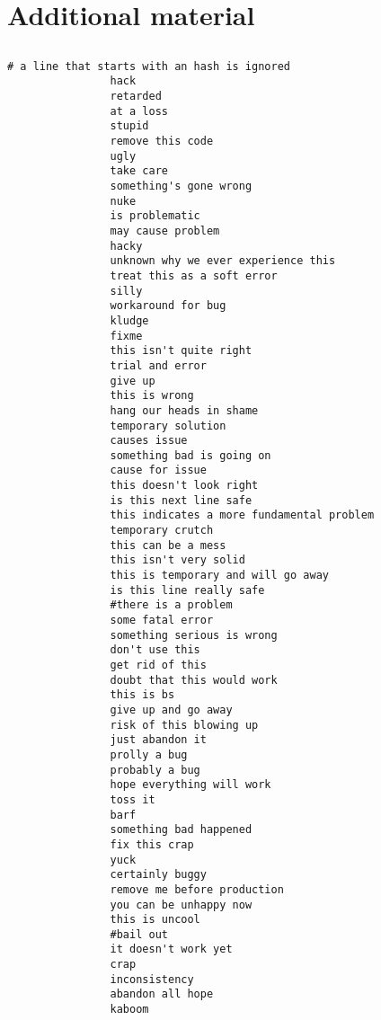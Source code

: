 \chapter{Additional material}

\section{}

\begin{lstlisting}[caption={61 patterns for SATD detection}, label={lst:patterns61}]
                # a line that starts with an hash is ignored
                hack
                retarded
                at a loss
                stupid
                remove this code
                ugly
                take care
                something's gone wrong
                nuke
                is problematic
                may cause problem
                hacky
                unknown why we ever experience this
                treat this as a soft error
                silly
                workaround for bug
                kludge
                fixme
                this isn't quite right
                trial and error
                give up
                this is wrong
                hang our heads in shame
                temporary solution
                causes issue
                something bad is going on
                cause for issue
                this doesn't look right
                is this next line safe
                this indicates a more fundamental problem
                temporary crutch
                this can be a mess
                this isn't very solid
                this is temporary and will go away
                is this line really safe
                #there is a problem
                some fatal error
                something serious is wrong
                don't use this
                get rid of this
                doubt that this would work
                this is bs
                give up and go away
                risk of this blowing up
                just abandon it
                prolly a bug
                probably a bug
                hope everything will work
                toss it
                barf
                something bad happened
                fix this crap
                yuck
                certainly buggy
                remove me before production
                you can be unhappy now
                this is uncool
                #bail out
                it doesn't work yet
                crap
                inconsistency
                abandon all hope
                kaboom
\end{lstlisting}

